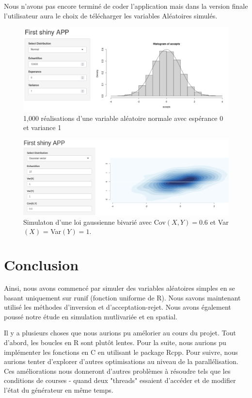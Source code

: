 \documentclass[10pt]{article} %
\begin{document}
Nous n'avons pas encore terminé de coder l'application mais dans la version finale l'utilisateur aura le choix de télécharger les variables
Aléatoires simulés.

\begin{figure}[h!]
\centering
\includegraphics[width=\linewidth]{media/apppic1.png}
\vspace{-5cm}
\caption{1,000 réalisations d'une variable aléatoire normale avec espérance 0 et variance 1}
\end{figure}

\begin{figure}[h!]
\centering
\includegraphics[width=\linewidth]{media/rshiny_gauss.png}
\caption{Simulaton d'une loi gaussienne bivarié avec Cov$(X, Y) = 0.6$ et Var$(X)$ = Var$(Y) = 1$.}
\end{figure}

\section{Conclusion}

Ainsi, nous avons commencé par simuler des variables aléatoires simples en se basant uniquement sur runif (fonction uniforme de R). Nous savons maintenant utilisé les méthodes d'inversion et d'acceptation-rejet. Nous avons également poussé notre étude en simulation mutlivariée et en spatial.

Il y a plusieurs choses que nous aurions pu amélorier au cours du projet.
Tout d'abord, les boucles en R sont plutôt lentes. Pour la suite, nous aurions pu implémenter les fonctions en C en utilisant le package Rcpp. Pour suivre, nous aurions tenter d'explorer d'autres optimisations au niveau de la parallélisation. Ces améliorations nous donneront d'autres problèmes à résoudre tels que les conditions de courses - quand deux "threads" essaient d'accéder et
de modifier l'état du générateur en même temps.
\end{document}
